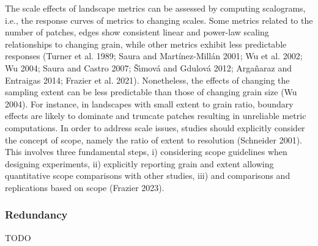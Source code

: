 \documentclass[
  10pt,
  a4paperpaper,
]{article}
\begin{document}
The scale effects of landscape metrics can be assessed by computing
scalograms, i.e., the response curves of metrics to changing scales.
Some metrics related to the number of patches, edges show consistent
linear and power-law scaling relationships to changing grain, while
other metrics exhibit less predictable responses (Turner et al. 1989;
Saura and Martínez-Millán 2001; Wu et al. 2002; Wu 2004; Saura and
Castro 2007; Šı́mová and Gdulová 2012; Argañaraz and Entraigas 2014;
Frazier et al. 2021). Nonetheless, the effects of changing the sampling
extent can be less predictable than those of changing grain size (Wu
2004). For instance, in landscapes with small extent to grain ratio,
boundary effects are likely to dominate and truncate patches resulting
in unreliable metric computations. In order to address scale issues,
studies should explicitly consider the concept of scope, namely the
ratio of extent to resolution (Schneider 2001). This involves three
fundamental steps, i) considering scope guidelines when designing
experiments, ii) explicitly reporting grain and extent allowing
quantitative scope comparisons with other studies, iii) and comparisons
and replications based on scope (Frazier 2023).

\subsubsection{Redundancy}\label{redundancy}

TODO
\end{document}
